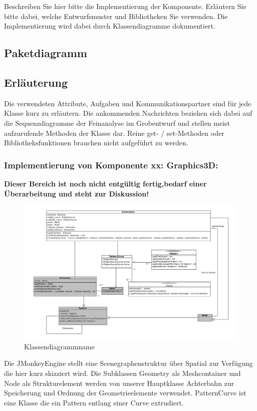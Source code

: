 Beschreiben Sie hier bitte die Implementierung der Komponente. Erläutern Sie
bitte dabei, welche Entwurfsmuster und Bibliotheken Sie verwenden. Die
Implementierung wird dabei durch Klassendiagramme dokumentiert.

\subsection{Paketdiagramm}
\subsection{Erläuterung}

Die verwendeten Attribute, Aufgaben und Kommunikationspartner sind für jede
Klasse kurz zu erläutern. Die ankommenden Nachrichten beziehen sich dabei auf
die Sequenzdiagramme der Feinanalyse im Grobentwurf und stellen meist
aufzurufende Methoden der Klasse dar.  Reine get- / set-Methoden oder
Bibliotheksfunktionen brauchen nicht aufgeführt zu werden.


\subsubsection{Implementierung von Komponente
         xx: Graphics3D:}

\textbf {Dieser Bereich ist noch nicht entgültig fertig,bedarf einer Überarbeitung und steht zur Diskussion!}

\begin{figure}
\includegraphics[width=\linewidth]{bilder/klassendiagramm_004}
\caption{Klassendiagrammname}
\end{figure}

Die JMonkeyEngine stellt eine Scenegraphenstruktur über Spatial zur Verfügung die hier kurz skizziert wird. Die Subklassen Geometry als Meshcontainer und Node als Strukturelement werden von unserer Hauptklasse Achterbahn 
zur Speicherung und Ordnung der Geometrieelemente verwendet. PatternCurve ist eine Klasse die ein Pattern entlang einer Curve extrudiert.

